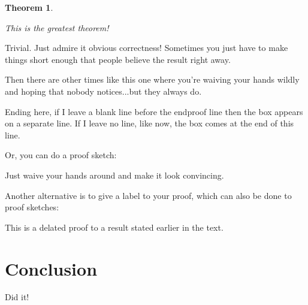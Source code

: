 \documentclass[12pt]{dalcsthesis}
\newtheorem{theorem}{Theorem}
\begin{document}
\begin{theorem}

    \label{theorem-greatest}

    This is the greatest theorem!

\end{theorem}

\begin{pf}
    Trivial. Just admire it obvious correctness!  Sometimes you just have to 
    make things short enough that people believe the result right away.

    Then there are other times like this one where you're waiving your hands 
    wildly and hoping that nobody notices...but they always do.

    Ending here, if I leave a blank line before the endproof line then the 
    box appears on a separate line.  If I leave no line, like now, the box 
    comes at the end of this line.
\end{pf}

Or, you can do a proof sketch:

\begin{ps}
    Just waive your hands around and make it look convincing.
\end{ps}

Another alternative is to give a label to your proof, which can also be
done to proof sketches:

\begin{pf}
This is a delated proof to a result stated earlier in the text.
\end{pf}

\chapter{Conclusion}

Did it!



\end{document}
